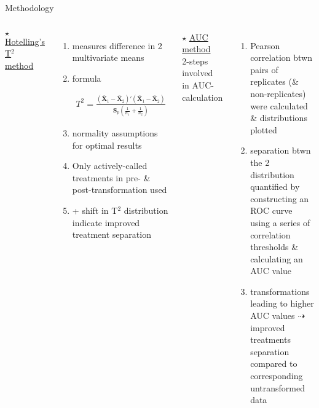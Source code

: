 \documentclass[11pt]{beamer}
\begin{document}
\begin{frame}{Methodology}
\begin{columns}
$\star$ \underline{Hotelling's T$^{2}$ method}
\begin{enumerate}[$\leadsto$]
\item measures difference in 2 multivariate means
\item formula \\
\begin{flushleft}
\begin{equation*}
\begin{split}
T^2 =
\frac{(\mathbf{\bar{X}}_1-\mathbf{\bar{X}}_2)\prime(\mathbf{\bar{X}}_1-\mathbf{\bar{X}}_2)}{\boldsymbol{S}_p(\frac{1}{n_1}+\frac{1}{n_2})}
\end{split}
\end{equation*}
\end{flushleft}
\item normality assumptions for optimal results
\item Only actively-called treatments in pre- \& post-transformation used
\item + shift in T$^2$ distribution indicate improved treatment separation
\end{enumerate}
$\star$ \underline{AUC method} \\
2-steps involved in AUC-calculation
\begin{enumerate}[$\leadsto$]
\item Pearson correlation btwn pairs of replicates (\& non-replicates) were calculated \& distributions plotted
\item separation btwn the 2 distribution quantified by constructing an ROC curve using a series of correlation thresholds \& calculating an AUC value
\item transformations leading to higher AUC values $\dashrightarrow$ improved treatments separation compared to corresponding untransformed data
\end{enumerate}
\end{columns}
\end{frame}
\end{document}
